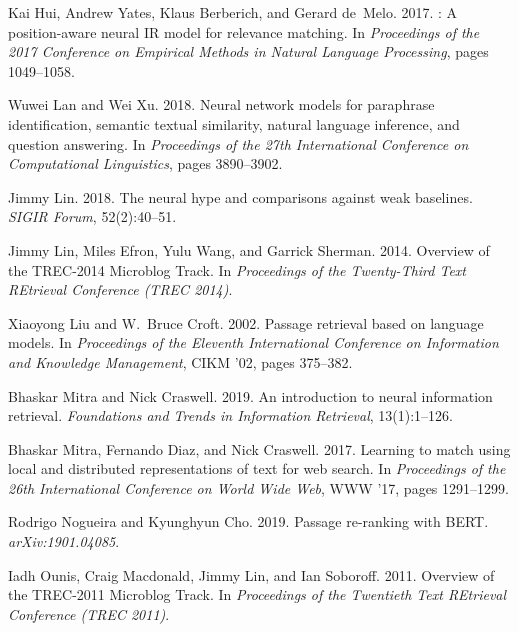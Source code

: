 \documentclass[11pt,a4paper]{article}
\begin{document}
\begin{thebibliography}{26}
Kai Hui, Andrew Yates, Klaus Berberich, and Gerard de~Melo. 2017.
: A position-aware neural {IR} model for relevance matching.
\newblock In \emph{Proceedings of the 2017 Conference on Empirical Methods in
  Natural Language Processing}, pages 1049--1058.

Wuwei Lan and Wei Xu. 2018.
\newblock Neural network models for paraphrase identification, semantic textual
  similarity, natural language inference, and question answering.
\newblock In \emph{Proceedings of the 27th International Conference on
  Computational Linguistics}, pages 3890--3902.

Jimmy Lin. 2018.
\newblock The neural hype and comparisons against weak baselines.
\newblock \emph{SIGIR Forum}, 52(2):40--51.

Jimmy Lin, Miles Efron, Yulu Wang, and Garrick Sherman. 2014.
\newblock Overview of the {TREC-2014} {Microblog} {Track}.
\newblock In \emph{Proceedings of the Twenty-Third Text REtrieval Conference
  (TREC 2014)}.

Xiaoyong Liu and W.~Bruce Croft. 2002.
\newblock Passage retrieval based on language models.
\newblock In \emph{Proceedings of the Eleventh International Conference on
  Information and Knowledge Management}, CIKM '02, pages 375--382.

Bhaskar Mitra and Nick Craswell. 2019.
\newblock An introduction to neural information retrieval.
\newblock \emph{Foundations and Trends in Information Retrieval}, 13(1):1--126.

Bhaskar Mitra, Fernando Diaz, and Nick Craswell. 2017.
\newblock Learning to match using local and distributed representations of text
  for web search.
\newblock In \emph{Proceedings of the 26th International Conference on World
  Wide Web}, WWW '17, pages 1291--1299.

Rodrigo Nogueira and Kyunghyun Cho. 2019.
\newblock Passage re-ranking with {BERT}.
\newblock \emph{arXiv:1901.04085}.

Iadh Ounis, Craig Macdonald, Jimmy Lin, and Ian Soboroff. 2011.
\newblock Overview of the {TREC-2011} {Microblog} {Track}.
\newblock In \emph{Proceedings of the Twentieth Text REtrieval Conference (TREC
  2011)}.


\end{thebibliography}
\end{document}
